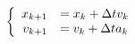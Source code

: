 \documentclass{article}
\begin{document}
\thispagestyle{empty}


$$
\left \{ \begin{array}{r l}
x_{k+1} & = x_k + \Delta t v_k\\
v_{k+1} & = v_k + \Delta t a_k
\end{array} \right.
$$
\end{document}
